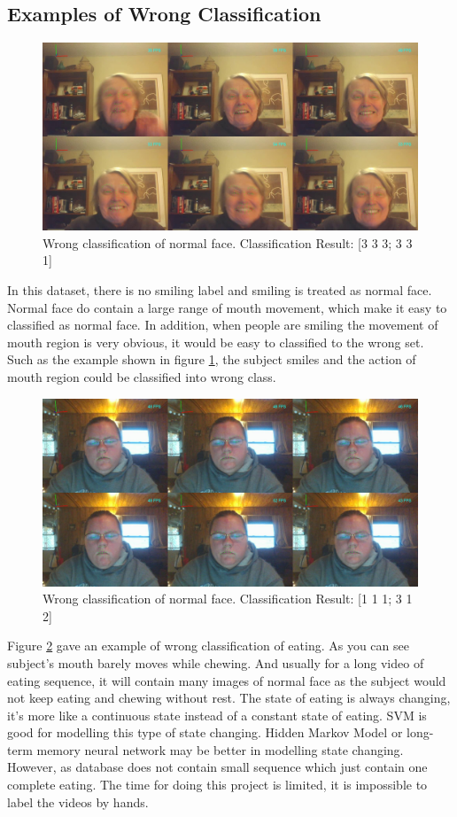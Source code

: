 \subsection{Examples of Wrong Classification}
\begin{figure}[ht]
\centering
\includegraphics[width = \textwidth]{imgs/Wrong_NF00.jpg}
\caption{Wrong classification of normal face. Classification Result: [3 3 3; 3 3 1]}
\label{fig:EXPNF}
\end{figure}
In this dataset, there is no smiling label and smiling is treated as normal face. Normal face do contain a large range of mouth movement, which make it easy to classified as normal face. In addition, when people are smiling the movement of mouth region is very obvious, it would be easy to classified to the wrong set. Such as the example shown in figure \ref{fig:EXPNF}, the subject smiles and the action of mouth region could be classified into wrong class.
\newpage
\begin{figure}[ht]
\centering
\includegraphics[width = \textwidth]{imgs/Wrong_E00.jpg}
\caption{Wrong classification of normal face. Classification Result: [1 1 1; 3 1 2]}
\label{fig:EXPE}
\end{figure}
Figure \ref{fig:EXPE} gave an example of wrong classification of eating. As you can see subject's mouth barely moves while chewing. And usually for a long video of eating sequence, it will contain many images of normal face as the subject would not keep eating and chewing without rest. The state of eating is always changing, it's more like a continuous state instead of a constant state of eating. SVM is good for modelling this type of state changing. Hidden Markov Model or long-term memory neural network may be better in modelling state changing. However, as database does not contain small sequence which just contain one complete eating. The time for doing this project is limited, it is  impossible to label the videos by hands.
